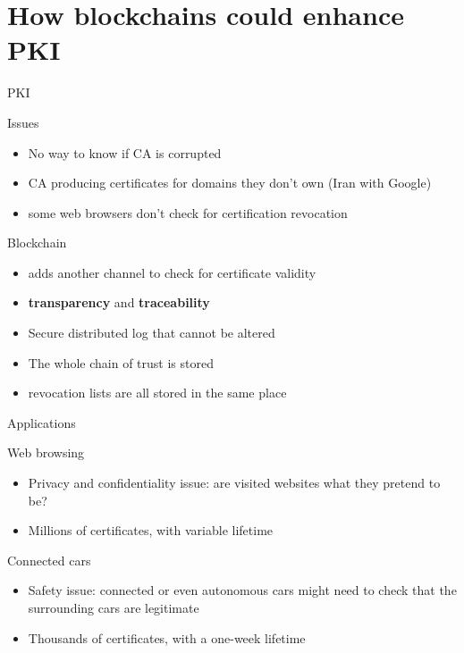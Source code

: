 \section[Blockchains for PKI]{How blockchains could enhance PKI}

\begin{frame}{PKI}
	\begin{alertblock}{Issues}
		\begin{itemize}
			\item No way to know if CA is corrupted
			\item CA producing certificates for domains they don't own (Iran with Google)
			\item some web browsers don't check for certification revocation
		\end{itemize}
	\end{alertblock}

	\begin{exampleblock}{Blockchain}
		\begin{itemize}
			\item adds another channel to check for certificate validity
			\item \textbf{transparency} and \textbf{traceability}
			\item Secure distributed log that cannot be altered
			\item The whole chain of trust is stored
			\item revocation lists are all stored in the same place
		\end{itemize}
	\end{exampleblock}
\end{frame}

\begin{frame}{Applications}

	\begin{exampleblock}{Web browsing}
		\begin{itemize}
			\item Privacy and confidentiality issue: are visited websites what they pretend to be?
			\item Millions of certificates, with variable lifetime
		\end{itemize}
	\end{exampleblock}
	
	\begin{alertblock}{Connected cars}
		\begin{itemize}
			\item Safety issue: connected or even autonomous cars might need to check that the surrounding cars are legitimate
			\item Thousands of certificates, with a one-week lifetime
		\end{itemize}
	\end{alertblock}


\end{frame}